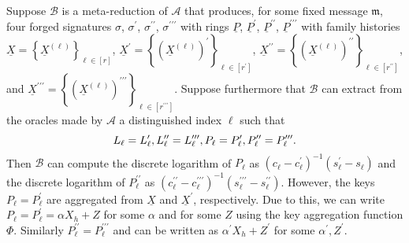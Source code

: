 \documentclass{mrl}
\theoremstyle{definition}
\numberwithin{theorem}{subsection}
\newcommand{\adversary}{\mathcal{A}}
\begin{document}
Suppose $\mathcal{B}$ is a meta-reduction of $\adversary$ that produces, for some fixed message $\mathfrak{m}$, four forged signatures $\sigma$, $\sigma^\prime$, $\sigma^{\prime \prime}$, $\sigma^{\prime \prime \prime}$ with rings $\underline{P}$, $\underline{P}^\prime$, $\underline{P}^{\prime \prime}$, $\underline{P}^{\prime \prime \prime}$ with family histories $\underline{X} = \left\{\underline{X}^{(\ell)}\right\}_{\ell \in [r]}$, $\underline{X}^\prime = \left\{(\underline{X}^{ (\ell)})^\prime\right\}_{\ell \in [r^\prime] }$, $\underline{X}^{\prime \prime} = \left\{(\underline{X}^{(\ell)})^{\prime \prime}\right\}_{\ell \in [r^{\prime \prime}]}$, and $\underline{X}^{\prime \prime \prime} = \left\{(\underline{X}^{ (\ell)})^{\prime \prime \prime}\right\}_{\ell \in [r^{\prime \prime\prime}]}$. Suppose furthermore that $\mathcal{B}$ can extract from the oracles made by $\adversary$ a distinguished index $\ell$ such that \[L_\ell = L_\ell^\prime, \vspace{0.05in} L_\ell^{\prime \prime} = L_\ell^{\prime \prime \prime}, \vspace{0.05in} 
P_\ell = P_\ell^\prime, \vspace{0.05in}  P_\ell^{\prime \prime} = P_\ell^{\prime \prime \prime}.\] Then $\mathcal{B}$ can compute the discrete logarithm of $P_\ell$ as $(c_\ell - c_\ell^\prime)^{-1}(s_\ell^\prime - s_\ell)$ and the discrete logarithm of $P_\ell^{\prime \prime}$ as $(c_\ell^{\prime \prime} - c_\ell^{\prime \prime \prime})^{-1}(s_\ell^{\prime \prime \prime} - s_\ell^{\prime \prime})$.  However, the keys $P_\ell = P_\ell^\prime$ are aggregated from $\underline{X}$ and $\underline{X}^{\prime}$, respectively. Due to this, we can write $P_\ell = P_\ell^\prime = \alpha X_h + Z$ for some $\alpha$ and for some $Z$ using the key aggregation function $\Phi$. Similarly $P_\ell^{\prime \prime} = P_\ell^{\prime \prime \prime}$ and can be written as $\alpha^\prime X_h + Z^\prime$ for some $\alpha^\prime, Z^\prime$. 
\end{document}
